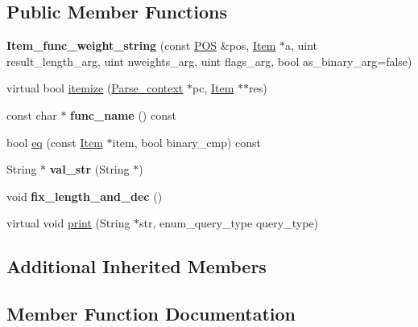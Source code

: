 \subsection*{Public Member Functions}
\begin{DoxyCompactItemize}
\item 
\mbox{\label{classItem__func__weight__string_aed54eec674603ccb8e7dc28c1ef42807}} 
{\bfseries Item\+\_\+func\+\_\+weight\+\_\+string} (const \mbox{\hyperlink{structYYLTYPE}{P\+OS}} \&pos, \mbox{\hyperlink{classItem}{Item}} $\ast$a, uint result\+\_\+length\+\_\+arg, uint nweights\+\_\+arg, uint flags\+\_\+arg, bool as\+\_\+binary\+\_\+arg=false)
\item 
virtual bool \mbox{\hyperlink{classItem__func__weight__string_ad8dca90ccc2473a483b575462bb6fbb5}{itemize}} (\mbox{\hyperlink{structParse__context}{Parse\+\_\+context}} $\ast$pc, \mbox{\hyperlink{classItem}{Item}} $\ast$$\ast$res)
\item 
\mbox{\label{classItem__func__weight__string_a5c75913c986a93829de5f9fb5640a8c9}} 
const char $\ast$ {\bfseries func\+\_\+name} () const
\item 
bool \mbox{\hyperlink{classItem__func__weight__string_a8a87a95257f1dc03839970a753c0fa9a}{eq}} (const \mbox{\hyperlink{classItem}{Item}} $\ast$item, bool binary\+\_\+cmp) const
\item 
\mbox{\label{classItem__func__weight__string_aa996fdd0f8262aef737fdbac242b18cd}} 
String $\ast$ {\bfseries val\+\_\+str} (String $\ast$)
\item 
\mbox{\label{classItem__func__weight__string_a697a93a45038e4c4b1b6af98b5f81164}} 
void {\bfseries fix\+\_\+length\+\_\+and\+\_\+dec} ()
\item 
virtual void \mbox{\hyperlink{classItem__func__weight__string_a57eca2ad6eba0b12baba9fc800b77013}{print}} (String $\ast$str, enum\+\_\+query\+\_\+type query\+\_\+type)
\end{DoxyCompactItemize}
\subsection*{Additional Inherited Members}


\subsection{Member Function Documentation}
\mbox{\label{classItem__func__weight__string_a8a87a95257f1dc03839970a753c0fa9a}} 
